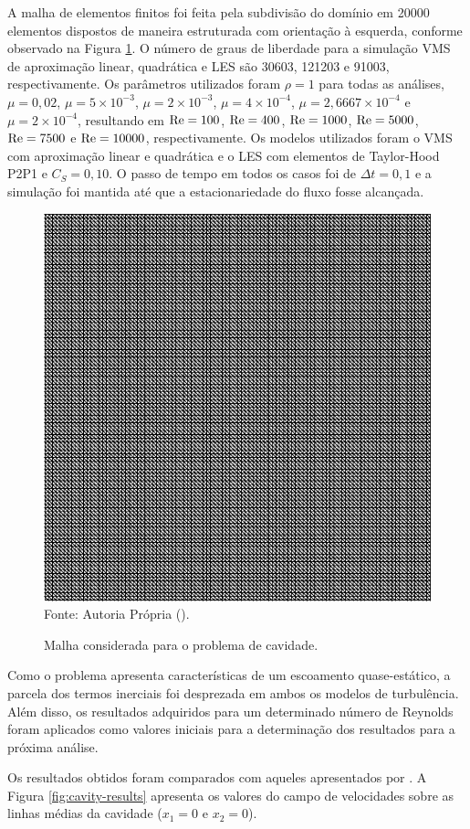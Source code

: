 A malha de elementos finitos foi feita pela subdivisão do domínio em 20000 elementos dispostos de maneira estruturada com orientação à esquerda, conforme observado na Figura \ref{fig:cavity_disc}. O número de graus de liberdade para a simulação VMS de aproximação linear, quadrática e LES são 30603, 121203 e 91003, respectivamente. Os parâmetros utilizados foram $\rho=1$ para todas as análises, $\mu=0,02$, $\mu=5\times10^{-3}$, $\mu=2\times10^{-3}$, $\mu=4\times10^{-4}$, $\mu=2,6667\times10^{-4}$ e $\mu=2\times10^{-4}$, resultando em $\mathrm{Re}=100$, $\mathrm{Re}=400$, $\mathrm{Re}=1000$, $\mathrm{Re}=5000$, $\mathrm{Re}=7500$ e $\mathrm{Re}=10000$, respectivamente. Os modelos utilizados foram o VMS com aproximação linear e quadrática e o LES com elementos de Taylor-Hood P2P1 e $C_S=0,10$. O passo de tempo em todos os casos foi de $\Delta t=0,1$ e a simulação foi mantida até que a estacionariedade do fluxo fosse alcançada.

\begin{figure}[h!]
    \centering
    \caption{Malha considerada para o problema de cavidade.}
    \includegraphics[width=.6\linewidth]{Figuras/Cavity/mesh.pdf}
    \\Fonte: Autoria Própria (\the\year).
    \label{fig:cavity_disc}
\end{figure}

Como o problema apresenta características de um escoamento quase-estático, a parcela dos termos inerciais foi desprezada em ambos os modelos de turbulência. Além disso, os resultados adquiridos para um determinado número de Reynolds foram aplicados como valores iniciais para a determinação dos resultados para a próxima análise.

Os resultados obtidos foram comparados com aqueles apresentados por . A Figura \ref{fig:cavity-results} apresenta os valores do campo de velocidades sobre as linhas médias da cavidade ($x_1=0$ e $x_2=0$).

